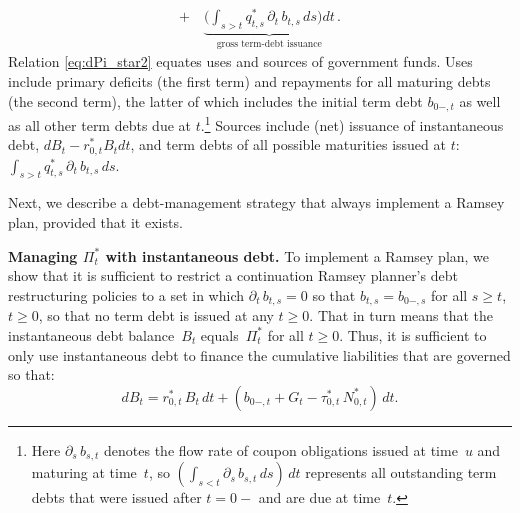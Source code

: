 \documentclass[12pt]{article}
\newcommand{\NW}[1]{{\textcolor{blue}{#1}}}
\newcommand{\TS}[1]{{\textcolor{magenta}{#1}}}
\begin{document}
{\begin{align}
 + \quad
 \underbrace{\biggl(\int_{s > t} q_{t,s}^*\, \partial_t\, b_{t,s}\, ds\biggr) dt}_{\text{gross term-debt issuance}} 
\, . 
\end{align}
Relation \eqref{eq:dPi_star2} equates uses and sources  of government funds. 
Uses include  primary deficits (the first term) and  repayments for all maturing debts (the second  term), the latter of which  includes  the initial term debt $b_{0-,t}$ as well as all other term debts due at $t$.\footnote{Here  
{$\partial_s\, b_{s,t}$} denotes the flow rate of coupon obligations issued at time~$u$ and maturing at time~$t$, so $(\int_{s<t} \partial_s\, b_{s,t}\, ds)\, dt$  represents  all outstanding term debts that were issued after $t=0-$ and are due at time~$t$.} 
Sources include  (net) issuance of instantaneous debt, $dB_t -r_{0, t}^*B_tdt$, and term debts of all possible maturities issued at $t$: $\int_{s > t} q_{t,s}^*\, \partial_t\, b_{t,s}\, ds$. %

%


Next, we describe a debt-management strategy that always implement a Ramsey plan, provided that it exists. 

\medskip
\noindent\textbf{Managing $\Pi_t^*$ with instantaneous debt.}\quad
To implement a Ramsey plan, we show that it is sufficient to restrict a continuation Ramsey planner's  debt restructuring policies to a set in which $\partial_t\, b_{t,s} = 0$ so that $b_{t,s} = b_{0-,s}$ for all $s \ge t$, $t \ge 0$, so that no term debt is issued at any $t \ge 0$. That in turn means that the instantaneous debt balance~$B_t$ equals~$\Pi_t^*$ for all $t \ge 0$. 
Thus, it is sufficient to only use instantaneous debt to finance the cumulative liabilities that are governed so that: 
\begin{equation}\label{eq:dBt}
dB_t = r_{0,t}^*\, B_t\, dt + (b_{0-,t}+G_t-\tau_{0,t}^*\, N_{0,t}^*)\, dt.
\end{equation}

}
\end{document}
